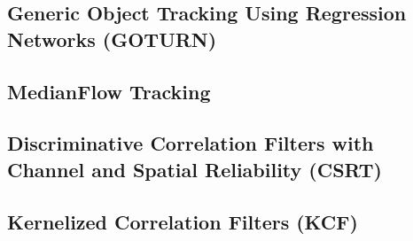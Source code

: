 \documentclass[12pt]{article}
\begin{document}
\subsection{Generic Object Tracking Using Regression Networks (GOTURN)}

\subsection{MedianFlow Tracking}

\subsection{Discriminative Correlation Filters with Channel and Spatial Reliability (CSRT)}

\subsection{Kernelized Correlation Filters (KCF)}



\end{document}
